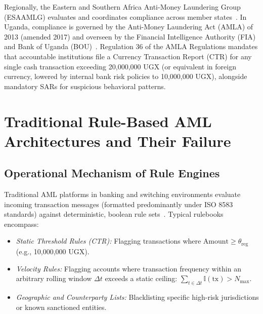 Regionally, the Eastern and Southern Africa Anti-Money Laundering Group (ESAAMLG) evaluates and coordinates compliance across member states~\cite{issafrica-monograph}. In Uganda, compliance is governed by the Anti-Money Laundering Act (AMLA) of 2013 (amended 2017) and overseen by the Financial Intelligence Authority (FIA) and Bank of Uganda (BOU)~\cite{FATF2020}. Regulation 36 of the AMLA Regulations mandates that accountable institutions file a Currency Transaction Report (CTR) for any single cash transaction exceeding 20,000,000 UGX (or equivalent in foreign currency, lowered by internal bank risk policies to 10,000,000 UGX), alongside mandatory SARs for suspicious behavioral patterns.

\section{Traditional Rule-Based AML Architectures and Their Failure}
\subsection{Operational Mechanism of Rule Engines}
Traditional AML platforms in banking and switching environments evaluate incoming transaction messages (formatted predominantly under ISO 8583 standards) against deterministic, boolean rule sets~\cite{expertsystems, bellomarini2020rule}. Typical rulebooks encompass:
\begin{itemize}
    \item \textit{Static Threshold Rules (CTR):} Flagging transactions where $\text{Amount} \ge \theta_{\text{reg}}$ (e.g., 10,000,000 UGX).
    \item \textit{Velocity Rules:} Flagging accounts where transaction frequency within an arbitrary rolling window $\Delta t$ exceeds a static ceiling: $\sum_{t \in \Delta t} \mathbb{I}(\text{tx}) > N_{\max}$.
    \item \textit{Geographic and Counterparty Lists:} Blacklisting specific high-risk jurisdictions or known sanctioned entities.
\end{itemize}

